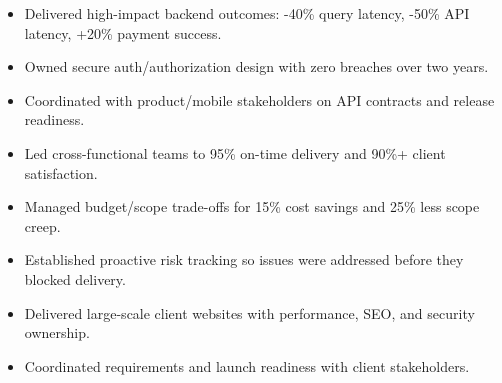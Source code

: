 \begin{itemize}
\item Delivered high-impact backend outcomes: -40\% query latency, -50\% API latency, +20\% payment success.
\item Owned secure auth/authorization design with zero breaches over two years.
\item Coordinated with product/mobile stakeholders on API contracts and release readiness.
\end{itemize}
\divider

\begin{itemize}
\item Led cross-functional teams to 95\% on-time delivery and 90\%+ client satisfaction.
\item Managed budget/scope trade-offs for 15\% cost savings and 25\% less scope creep.
\item Established proactive risk tracking so issues were addressed before they blocked delivery.
\end{itemize}
\divider

\begin{itemize}
\item Delivered large-scale client websites with performance, SEO, and security ownership.
\item Coordinated requirements and launch readiness with client stakeholders.
\end{itemize}

\newpage
\switchcolumn
